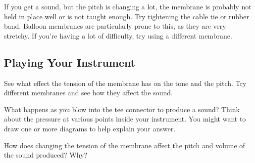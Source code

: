 \documentclass{article}
\begin{document}
If you get a sound, but the pitch is changing a lot, the membrane is probably not held in place well or is not taught enough. Try tightening the cable tie or rubber band. Balloon membranes are particularly prone to this, as they are very stretchy. If you're having a lot of difficulty, try using a different membrane.

\subsection{Playing Your Instrument}


See what effect the tension of the membrane has on the tone and the pitch. Try different membranes and see how they affect the sound.

\clearpage

\question{}

What happens as you blow into the tee connector to produce a sound? Think about the pressure at various points inside your instrument. You might want to draw one or more diagrams to help explain your answer.

\answertext[height = 18cm]{}

\clearpage

\question{}

How does changing the tension of the membrane affect the pitch and volume of the sound produced? Why?

\answertext[height = 10cm]{}
\end{document}
